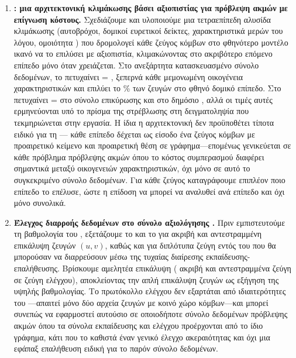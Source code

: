 \begin{enumerate}

    \item \textbf{: μια αρχιτεκτονική κλιμάκωσης βάσει αξιοπιστίας για
    πρόβλεψη ακμών με επίγνωση κόστους.}
    Σχεδιάζουμε και υλοποιούμε μια τετραεπίπεδη αλυσίδα κλιμάκωσης
    (αυτοβρόχοι, δομικοί ευρετικοί δείκτες, χαρακτηριστικά μερών του λόγου,
    ομοιότητα ) που δρομολογεί κάθε ζεύγος κόμβων στο
    φθηνότερο μοντέλο ικανό να το επιλύσει με αξιοπιστία, κλιμακώνοντας στο
    ακριβότερο επόμενο επίπεδο μόνο όταν χρειάζεται.
    Στο ανεξάρτητα κατασκευασμένο σύνολο δεδομένων, το  πετυχαίνει
     = \WfCascadeFone{}, ξεπερνά κάθε μεμονωμένη οικογένεια
    χαρακτηριστικών και επιλύει το \WfTierOnePct\% των ζευγών στο φθηνό δομικό
    επίπεδο.
    Στο  πετυχαίνει  = \CascadeValFone{} στο
    σύνολο επικύρωσης και \KaggleBaselinePublic{} στο δημόσιο ,
    αλλά οι τιμές αυτές ερμηνεύονται υπό το πρίσμα της στρέβλωσης
    στη δειγματοληψία που τεκμηριώνεται στην εργασία.
    Η ίδια η αρχιτεκτονική δεν προϋποθέτει τίποτα ειδικό για τη ---
    κάθε επίπεδο δέχεται ως είσοδο ένα ζεύγος κόμβων με προαιρετικό κείμενο και
    προαιρετική θέση σε γράφημα---επομένως γενικεύεται σε κάθε πρόβλημα
    πρόβλεψης ακμών όπου το κόστος συμπερασμού διαφέρει σημαντικά μεταξύ
    οικογενειών χαρακτηριστικών, όχι μόνο σε αυτό το συγκεκριμένο σύνολο
    δεδομένων.
    Για κάθε ζεύγος καταγράφουμε επιπλέον ποιο επίπεδο το επέλυσε,
    ώστε η επίδοση να μπορεί να αναλυθεί ανά επίπεδο και όχι μόνο συνολικά.

    \item \textbf{Έλεγχος διαρροής δεδομένων στο σύνολο αξιολόγησης .}
    Πριν εμπιστευτούμε τη βαθμολογία του , εξετάζουμε το
    \texttt{} και το \texttt{} για
    ακριβή και αντεστραμμένη επικάλυψη ζευγών $(u,v)$, καθώς και για διπλότυπα
    ζεύγη εντός του \texttt{} που θα μπορούσαν να διαρρεύσουν
    μέσω της τυχαίας διαίρεσης εκπαίδευσης-επαλήθευσης.
    Βρίσκουμε αμελητέα
    επικάλυψη (\LeakageExact{} ακριβή και \LeakageReversed{} αντεστραμμένα ζεύγη σε \TestPairs{} ζεύγη ελέγχου),
    αποκλείοντας την απλή επικάλυψη ζευγών ως εξήγηση της υψηλής βαθμολογίας.
    Το πρωτόκολλο ελέγχου δεν εξαρτάται από ιδιαιτερότητες του
    ---απαιτεί μόνο δύο αρχεία ζευγών με κοινό χώρο κόμβων---και
    μπορεί συνεπώς να εφαρμοστεί αυτούσιο σε οποιοδήποτε σύνολο δεδομένων
    πρόβλεψης ακμών όπου τα σύνολα εκπαίδευσης και ελέγχου προέρχονται από το
    ίδιο γράφημα, κάτι που το καθιστά έναν γενικό έλεγχο ακεραιότητας και όχι μια
    εφάπαξ επαλήθευση ειδική για το παρόν σύνολο δεδομένων.


\end{enumerate}
